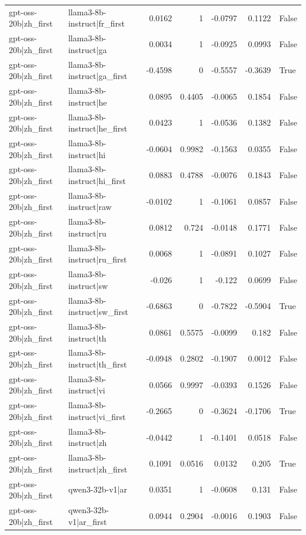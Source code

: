 \begin{table}
\begin{tabular}{l l r r r r l}
gpt-oss-20b|zh_first & llama3-8b-instruct|fr_first & 0.0162 & 1 & -0.0797 & 0.1122 & False \\
gpt-oss-20b|zh_first & llama3-8b-instruct|ga & 0.0034 & 1 & -0.0925 & 0.0993 & False \\
gpt-oss-20b|zh_first & llama3-8b-instruct|ga_first & -0.4598 & 0 & -0.5557 & -0.3639 & True \\
gpt-oss-20b|zh_first & llama3-8b-instruct|he & 0.0895 & 0.4405 & -0.0065 & 0.1854 & False \\
gpt-oss-20b|zh_first & llama3-8b-instruct|he_first & 0.0423 & 1 & -0.0536 & 0.1382 & False \\
gpt-oss-20b|zh_first & llama3-8b-instruct|hi & -0.0604 & 0.9982 & -0.1563 & 0.0355 & False \\
gpt-oss-20b|zh_first & llama3-8b-instruct|hi_first & 0.0883 & 0.4788 & -0.0076 & 0.1843 & False \\
gpt-oss-20b|zh_first & llama3-8b-instruct|raw & -0.0102 & 1 & -0.1061 & 0.0857 & False \\
gpt-oss-20b|zh_first & llama3-8b-instruct|ru & 0.0812 & 0.724 & -0.0148 & 0.1771 & False \\
gpt-oss-20b|zh_first & llama3-8b-instruct|ru_first & 0.0068 & 1 & -0.0891 & 0.1027 & False \\
gpt-oss-20b|zh_first & llama3-8b-instruct|sw & -0.026 & 1 & -0.122 & 0.0699 & False \\
gpt-oss-20b|zh_first & llama3-8b-instruct|sw_first & -0.6863 & 0 & -0.7822 & -0.5904 & True \\
gpt-oss-20b|zh_first & llama3-8b-instruct|th & 0.0861 & 0.5575 & -0.0099 & 0.182 & False \\
gpt-oss-20b|zh_first & llama3-8b-instruct|th_first & -0.0948 & 0.2802 & -0.1907 & 0.0012 & False \\
gpt-oss-20b|zh_first & llama3-8b-instruct|vi & 0.0566 & 0.9997 & -0.0393 & 0.1526 & False \\
gpt-oss-20b|zh_first & llama3-8b-instruct|vi_first & -0.2665 & 0 & -0.3624 & -0.1706 & True \\
gpt-oss-20b|zh_first & llama3-8b-instruct|zh & -0.0442 & 1 & -0.1401 & 0.0518 & False \\
gpt-oss-20b|zh_first & llama3-8b-instruct|zh_first & 0.1091 & 0.0516 & 0.0132 & 0.205 & True \\
gpt-oss-20b|zh_first & qwen3-32b-v1|ar & 0.0351 & 1 & -0.0608 & 0.131 & False \\
gpt-oss-20b|zh_first & qwen3-32b-v1|ar_first & 0.0944 & 0.2904 & -0.0016 & 0.1903 & False \\

\end{tabular}
\end{table}
